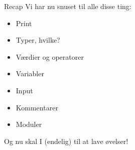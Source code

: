 \documentclass{beamer}
\begin{document}
\begin{frame}{Recap}
Vi har nu snuset til alle disse ting:
\begin{itemize}
\item Print
\pause
\item Typer, hvilke?
\pause
\item Værdier og operatorer
\pause
\item Variabler
\pause
\item Input
\pause
\item Kommentarer
\pause
\item Moduler
\end{itemize}
\pause
Og nu skal I (endelig) til at lave øvelser!
\end{frame}
\end{document}
